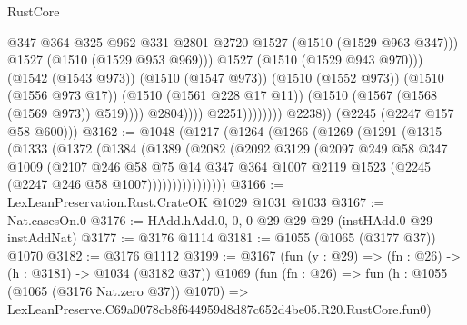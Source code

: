 \begin{lexlean}{RustCore}
\begin{coremodule}
                                            @347
                                            @364
                                            @325
                                            @962
                                            @331
                                            @2801
                                            @2720
                                            @1527
                                            (@1510 (@1529 @963 @347)))
                                          @1527
                                          (@1510 (@1529 @953 @969)))
                                        @1527
                                        (@1510 (@1529 @943 @970)))
                                      (@1542 (@1543 @973))
                                      (@1510 (@1547 @973))
                                      (@1510 (@1552 @973))
                                      (@1510 (@1556 @973 @17))
                                      (@1510 (@1561 @228 @17 @11))
                                      (@1510 (@1567 (@1568 (@1569 @973)) @519))))
                                  @2804))))
                          @2251))))))))
          @2238))
      (@2245 (@2247 @157 @58 @600)))
@3162 := @1048
    (@1217
      (@1264
        (@1266
          (@1269
            (@1291
              (@1315
                (@1333
                  (@1372
                    (@1384
                      (@1389
                        (@2082
                          (@2092
                            @3129
                            (@2097
                              @249
                              @58
                              @347
                              @1009
                              (@2107
                                @246
                                @58
                                @75
                                @14
                                @347
                                @364
                                @1007
                                @2119
                                @1523
                                (@2245 (@2247 @246 @58 @1007))))))))))))))))
@3166 := LexLeanPreservation.Rust.CrateOK @1029 @1031 @1033
@3167 := Nat.casesOn.{0}
@3176 := HAdd.hAdd.{0, 0, 0} @29 @29 @29 (instHAdd.{0} @29 instAddNat)
@3177 := @3176 @1114
@3181 := @1055 (@1065 (@3177 @37)) @1070
@3182 := @3176 @1112
@3199 := @3167
    (fun (y : @29) => (fn : @26) -> (h : @3181) -> @1034 (@3182 @37))
    @1069
    (fun (fn : @26) =>
    fun (h : @1055 (@1065 (@3176 Nat.zero @37)) @1070) =>
    LexLeanPreserve.C69a0078cb8f644959d8d87c652d4be05.R20.RustCore.fun0)

\end{coremodule}
\end{lexlean}

